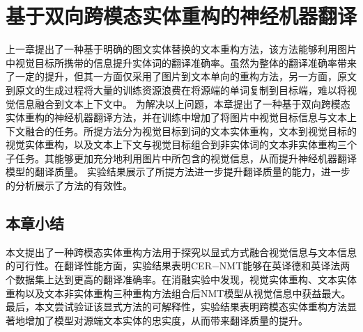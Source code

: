 \chapter{基于双向跨模态实体重构的神经机器翻译}

上一章提出了一种基于明确的图文实体替换的文本重构方法，该方法能够利用图片中视觉目标所携带的信息提升实体词的翻译准确率。虽然为整体的翻译准确率带来了一定的提升，但其一方面仅采用了图片到文本单向的重构方法，另一方面，原文到原文的生成过程将大量的训练资源浪费在将源端的单词复制到目标端，难以将视觉信息融合到文本上下文中。
为解决以上问题，本章提出了一种基于双向跨模态实体重构的神经机器翻译方法，并在训练中增加了将图片中视觉目标信息与文本上下文融合的任务。所提方法分为视觉目标到词的文本实体重构，文本到视觉目标的视觉实体重构，以及文本上下文与视觉目标组合到非实体词的文本非实体重构三个子任务。其能够更加充分地利用图片中所包含的视觉信息，从而提升神经机器翻译模型的翻译质量。
实验结果展示了所提方法进一步提升翻译质量的能力，进一步的分析展示了方法的有效性。








\section{本章小结}
本文提出了一种跨模态实体重构方法用于探究以显式方式融合视觉信息与文本信息的可行性。在翻译性能方面，实验结果表明CER$-$NMT能够在英译德和英译法两个数据集上达到更高的翻译准确率。在消融实验中发现，视觉实体重构、文本实体重构以及文本非实体重构三种重构方法组合后NMT模型从视觉信息中获益最大。最后，本文尝试验证该显式方法的可解释性，实验结果表明跨模态实体重构方法显著地增加了模型对源端文本实体的忠实度，从而带来翻译质量的提升。